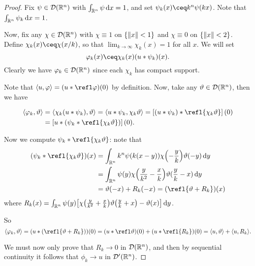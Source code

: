 \begin{proof}
	Fix $\psi \in \mathcal D(\mathbb R^n)$ with $\int_{\mathbb R^n} \psi \dd{x} = 1$, and set $\psi_k(x) \ceq k^n \psi(kx)$. Note that $\int_{\mathbb R^n} \psi_k \dd{x} = 1$.
	
	Now, fix any $\chi \in \mathcal D(\mathbb R^n)$ with $\chi \equiv 1$ on $\qty{\norm{x} < 1}$ and $\chi \equiv 0$ on $\qty{\norm{x} < 2}$. Define $\chi_k(x) \ceq \chi(x/k)$, so that $\lim_{k\to\infty} \chi_k(x) = 1$ for all $x$. We will set
	\[
	\phi_k(x) \ceq \chi_k(x) (u * \psi_k)(x). 
	\]
	Clearly we have $\varphi_k \in \mathcal D(\mathbb R^n)$ since each $\chi_k$ has compact support. 
	
	Note that $\ang{u, \phi} = (u * \refl\phi)(0)$ by definition. Now, take any $\vartheta \in \mathcal D(\mathbb R^n)$, then we have
	
	\begin{align*}
		\ang{\phi_k, \theta} &= \ang{\chi_k (u * \psi_k), \theta} = \ang{u * \psi_k, \chi_k \theta} = \qty[ (u * \psi_k) * \refl{\chi_k\theta}](0) \\
		&= \qty[u * \qty(\psi_k * \refl{\chi_k \theta})](0).
	\end{align*}

	Now we compute $\psi_k * \refl{\chi_k\theta}$: note that 
	\begin{align*}
		(\psi_k * \refl{\chi_k\theta})(x) &= \int_{\RR^n} k^n\psi(k(x-y)) \chi\qty(-\frac yk) \theta(-y) \dd{y} \\
		&= \int_{\RR^n} \psi(y) \chi\qty(\frac{y}{k^2} - \frac xk) \theta(\frac yk - x) \dd{y} \\
		&= \theta(-x) + R_k(-x) = (\refl{\theta + R_k})(x)
	\end{align*}
where $R_k(x) = \int_{\mathbb R^n} \psi(y) \qty[ \chi\qty(\frac y{k^2} + \frac xk) \vartheta\qty(\frac yk + x )- \vartheta(x)] \dd{y}$.

So \[
\ang{\phi_k, \theta} = (u * (\refl{\theta + R_k}))(0) = (u *\refl\theta)(0) + (u * \refl{R_k})(0) = \ang{u, \theta} + \ang{u, R_k}. 
\]

We must now only prove that $R_k \to 0$ in $\mathcal D(\mathbb R^n)$, and then by sequential continuity it follows that $\phi_k \to u$  in $\mathcal D'(\mathbb R^n)$. 
\end{proof}

